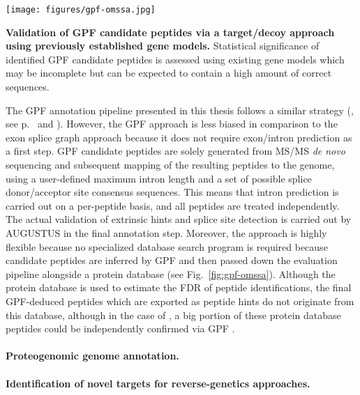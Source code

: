 \begin{SCtopfig}
\texttt{[image: figures/gpf-omssa.jpg]}
\caption{
{\bf Validation of GPF candidate peptides via a target/decoy approach
    using previously established gene models.} 
    Statistical significance of identified GPF candidate peptides is 
    assessed using existing gene models which may be incomplete but
    can be expected to contain a high amount of correct sequences.
}
\label{fig:gpf-omssa}
\end{SCtopfig}

The GPF annotation pipeline presented in this thesis follows a similar strategy
(\cite{Specht2011_GPF}, see p.~\pageref{section:gpf} and \pageref{paper:gpf}).
However, the GPF approach is less biased in comparison to the exon splice graph
approach because it does not require exon/intron prediction as a first step.
GPF candidate peptides are solely generated from MS/MS {\em de novo} sequencing
and subsequent mapping of the resulting peptides to the genome, using 
a user-defined maximum intron length and a set of possible splice donor/acceptor 
site consensus sequences.
This means that intron prediction is carried out on a per-peptide basis, and
all peptides are treated independently.
The actual validation of extrinsic hints and splice site detection is
carried out by AUGUSTUS in the final annotation step.
Moreover, the approach is highly flexible because no specialized database
search program is required because candidate peptides are inferred by GPF
and then passed down the evaluation pipeline alongside a protein database
(see Fig.~\ref{fig:gpf-omssa}).
Although the protein database is used to estimate the FDR of peptide 
identifications, the final GPF-deduced peptides which are exported as
peptide hints do not originate from this database, although in the case
of \cre, a big portion of these protein database peptides could be 
independently confirmed via GPF \citep{Specht2011_GPF}.


\paragraph{Proteogenomic genome annotation.}

\paragraph{Identification of novel targets for reverse-genetics approaches.}
